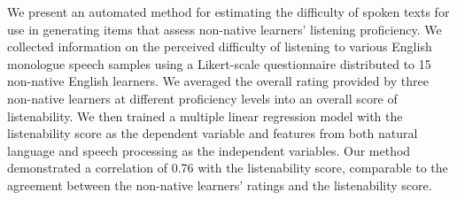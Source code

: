 We present an automated method for estimating the difficulty of spoken texts for use in generating items that assess non-native learners' listening proficiency. We collected information on the perceived difficulty of listening to various English monologue speech samples using a Likert-scale questionnaire distributed to 15 non-native English learners. We averaged the overall rating provided by three non-native learners at different proficiency levels into an overall score of listenability. We then trained a multiple linear regression model with the listenability score as the dependent variable and features from both natural language and speech processing as the independent variables. Our method demonstrated a correlation of 0.76 with the listenability score, comparable to the agreement between the non-native learners' ratings and the listenability score.
